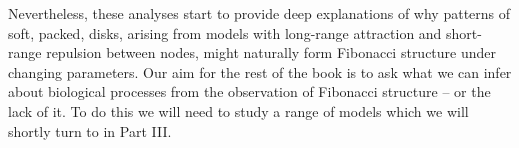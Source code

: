 Nevertheless, these analyses start to provide deep explanations of why patterns of soft, packed, disks, arising from models with long-range attraction and short-range repulsion between nodes, might naturally form Fibonacci structure under changing parameters. Our aim for the rest of the book is to ask what we can infer about biological processes from the observation of Fibonacci structure -- or the lack of it. To do this we will need to study a range of models which we will shortly turn to in Part III.




